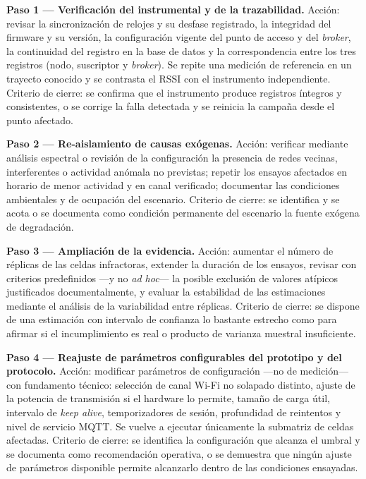 \documentclass[
  12pt,
]{article}
\begin{document}
\textbf{Paso 1 — Verificación del instrumental y de la trazabilidad.}
Acción: revisar la sincronización de relojes y su desfase registrado, la
integridad del firmware y su versión, la configuración vigente del punto
de acceso y del \emph{broker}, la continuidad del registro en la base de
datos y la correspondencia entre los tres registros (nodo, suscriptor y
\emph{broker}). Se repite una medición de referencia en un trayecto
conocido y se contrasta el RSSI con el instrumento independiente.
Criterio de cierre: se confirma que el instrumento produce registros
íntegros y consistentes, o se corrige la falla detectada y se reinicia
la campaña desde el punto afectado.

\textbf{Paso 2 — Re-aislamiento de causas exógenas.} Acción: verificar
mediante análisis espectral o revisión de la configuración la presencia
de redes vecinas, interferentes o actividad anómala no previstas;
repetir los ensayos afectados en horario de menor actividad y en canal
verificado; documentar las condiciones ambientales y de ocupación del
escenario. Criterio de cierre: se identifica y se acota o se documenta
como condición permanente del escenario la fuente exógena de
degradación.

\textbf{Paso 3 — Ampliación de la evidencia.} Acción: aumentar el número
de réplicas de las celdas infractoras, extender la duración de los
ensayos, revisar con criterios predefinidos —y no \emph{ad hoc}— la
posible exclusión de valores atípicos justificados documentalmente, y
evaluar la estabilidad de las estimaciones mediante el análisis de la
variabilidad entre réplicas. Criterio de cierre: se dispone de una
estimación con intervalo de confianza lo bastante estrecho como para
afirmar si el incumplimiento es real o producto de varianza muestral
insuficiente.

\textbf{Paso 4 — Reajuste de parámetros configurables del prototipo y
del protocolo.} Acción: modificar parámetros de configuración —no de
medición— con fundamento técnico: selección de canal Wi-Fi no solapado
distinto, ajuste de la potencia de transmisión si el hardware lo
permite, tamaño de carga útil, intervalo de \emph{keep alive},
temporizadores de sesión, profundidad de reintentos y nivel de servicio
MQTT. Se vuelve a ejecutar únicamente la submatriz de celdas afectadas.
Criterio de cierre: se identifica la configuración que alcanza el umbral
y se documenta como recomendación operativa, o se demuestra que ningún
ajuste de parámetros disponible permite alcanzarlo dentro de las
condiciones ensayadas.
\end{document}
